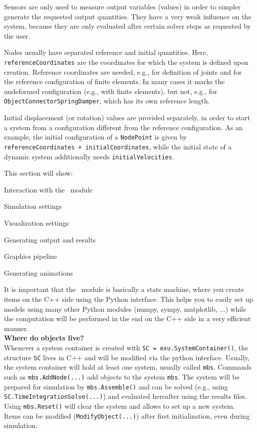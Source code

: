 Sensors are only used to measure output variables (values) in order to simpler generate the requested output quantities.
They have a very weak influence on the system, because they are only evaluated after certain solver steps as requested by the user.

Nodes usually have separated reference and initial quantities. Here, 
\texttt{referenceCoordinates} are the coordinates for which the system is defined upon creation. Reference coordinates are needed, e.g., for definition of joints and for the reference configuration of finite elements. In many cases it marks the undeformed configuration (e.g., with finite elements), but not, e.g., for \texttt{ObjectConnectorSpringDamper}, which has its own reference length. 

Initial displacement (or rotation) values are provided separately, in order to start a system from a configuration different from the reference configuration.
As an example, the initial configuration of a \texttt{NodePoint} is given by \texttt{referenceCoordinates + initialCoordinates}, while the initial state of a dynamic system additionally needs \texttt{initialVelocities}.


 \label{sec:exudynBasics}
This section will show:
\bi
	\item Interaction with the \codeName\ module
	\item Simulation settings
	\item Visualization settings
	\item Generating output and results
	\item Graphics pipeline
	\item Generating animations
\ei


It is important that the \codeName\ module is basically a state machine, where you create items on the C++ side using the Python interface. This helps you to easily set up models using many other Python modules (numpy, sympy, matplotlib, ...) while the computation will be performed in the end on the C++ side in a very efficient manner. 
\vspace{12pt}\\
{\bf Where do objects live?}\vspace{6pt}\\
Whenever a system container is created with \texttt{SC = exu.SystemContainer()}, the structure \texttt{SC} lives in C++ and will be modified via the python interface.
Usually, the system container will hold at least one system, usually called \texttt{mbs}.
Commands such as \texttt{mbs.AddNode(...)} add objects to the system \texttt{mbs}. 
The system will be prepared for simulation by \texttt{mbs.Assemble()} and can be solved (e.g., using \texttt{SC.TimeIntegrationSolve(...)}) and evaluated hereafter using the results files.
Using \texttt{mbs.Reset()} will clear the system and allows to set up a new system. Items can be modified (\texttt{ModifyObject(...)}) after first initialization, even during simulation.
%

